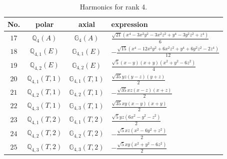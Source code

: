 \documentclass[fleqn,8pt,landscape]{jsarticle}
\begin{document}
\begin{table}[ht!]
\begin{center}
\caption{Harmonics for rank 4.}
\renewcommand{\arraystretch}{1.3}
\begin{tabular}{cccl} \hline \hline
No. & polar & axial & expression \\ \hline
$ 17 $ & $ \mathbb{Q}_{4}(A) $ & $ \mathbb{G}_{4}(A) $ & $ \frac{\sqrt{21} \left(x^{4} - 3 x^{2} y^{2} - 3 x^{2} z^{2} + y^{4} - 3 y^{2} z^{2} + z^{4}\right)}{6} $ \\
$ 18 $ & $ \mathbb{Q}_{4,1}(E) $ & $ \mathbb{G}_{4,1}(E) $ & $ - \frac{\sqrt{15} \left(x^{4} - 12 x^{2} y^{2} + 6 x^{2} z^{2} + y^{4} + 6 y^{2} z^{2} - 2 z^{4}\right)}{12} $ \\
$ 19 $ & $ \mathbb{Q}_{4,2}(E) $ & $ \mathbb{G}_{4,2}(E) $ & $ \frac{\sqrt{5} \left(x - y\right) \left(x + y\right) \left(x^{2} + y^{2} - 6 z^{2}\right)}{4} $ \\
$ 20 $ & $ \mathbb{Q}_{4,1}(T,1) $ & $ \mathbb{G}_{4,1}(T,1) $ & $ \frac{\sqrt{35} y z \left(y - z\right) \left(y + z\right)}{2} $ \\
$ 21 $ & $ \mathbb{Q}_{4,2}(T,1) $ & $ \mathbb{G}_{4,2}(T,1) $ & $ - \frac{\sqrt{35} x z \left(x - z\right) \left(x + z\right)}{2} $ \\
$ 22 $ & $ \mathbb{Q}_{4,3}(T,1) $ & $ \mathbb{G}_{4,3}(T,1) $ & $ \frac{\sqrt{35} x y \left(x - y\right) \left(x + y\right)}{2} $ \\
$ 23 $ & $ \mathbb{Q}_{4,1}(T,2) $ & $ \mathbb{G}_{4,1}(T,2) $ & $ \frac{\sqrt{5} y z \left(6 x^{2} - y^{2} - z^{2}\right)}{2} $ \\
$ 24 $ & $ \mathbb{Q}_{4,2}(T,2) $ & $ \mathbb{G}_{4,2}(T,2) $ & $ - \frac{\sqrt{5} x z \left(x^{2} - 6 y^{2} + z^{2}\right)}{2} $ \\
$ 25 $ & $ \mathbb{Q}_{4,3}(T,2) $ & $ \mathbb{G}_{4,3}(T,2) $ & $ - \frac{\sqrt{5} x y \left(x^{2} + y^{2} - 6 z^{2}\right)}{2} $ \\
 \hline \hline
\end{tabular}
\end{center}
\end{table}
\end{document}
